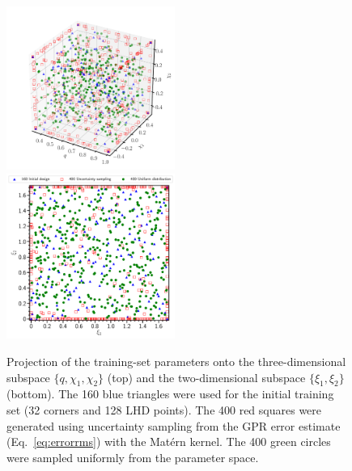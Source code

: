 \documentclass[prd,aps,letter,twocolumn,floatfix,notitlepage,nofootinbib]{revtex4-1}
\begin{document}
\begin{figure}[htb]
\centering
\includegraphics[width=0.49\textwidth]{trainingset3d.pdf}\\
\includegraphics[width=0.49\textwidth]{trainingset2d.pdf}
\caption{Projection of the training-set parameters onto the three-dimensional subspace $\{q, \chi_1, \chi_2\}$ (top) and the two-dimensional subspace $\{\xi_1, \xi_2\}$ (bottom). The 160 blue triangles were used for the initial training set (32 corners and 128 LHD points). The 400 red squares were generated using uncertainty sampling from the GPR error estimate (Eq.~\eqref{eq:errorrms}) with the Mat\'{e}rn kernel. The 400 green circles were sampled uniformly from the parameter space.
}
\label{fig:LHD}
\end{figure}
\end{document}
